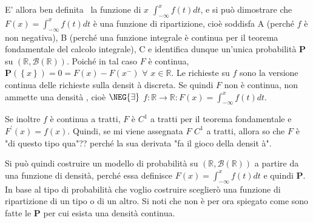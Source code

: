 \documentclass{article}
\begin{document}
E' allora ben definita \ la funzione di $x$ $\int_{-\infty }^{x}f\left(
t\right) dt$, e si pu\`{o} dimostrare che $F\left( x\right) =\int_{-\infty
}^{x}f\left( t\right) dt$ \`{e} una funzione di ripartizione, cio\`{e}
soddisfa A (perch\'{e} $f$ \`{e} non negativa), B (perch\'{e} una funzione
integrale \`{e} continua per il teorema fondamentale del calcolo integrale),
C e identifica dunque un'unica probabilit\`{a} $\mathbf{P}$ su $\left( 
\mathbb{R}
,\mathcal{B}\left( 
\mathbb{R}
\right) \right) $. Poich\'{e} in tal caso $F$ \`{e} continua, $\mathbf{P}%
\left( \left\{ x\right\} \right) =0=F\left( x\right) -F\left( x^{-}\right) $ 
$\forall $ $x\in 
\mathbb{R}
$. Le richieste su $f$ sono la versione continua delle richieste sulla densit%
\`{a} discreta. Se quindi $F$ non \`{e} continua, non ammette una densit\`{a}%
, cio\`{e} $\NEG{\exists}$ $f:%
\mathbb{R}
\rightarrow 
\mathbb{R}
:F\left( x\right) =\int_{-\infty }^{x}f\left( t\right) dt$.

Se inoltre $f$ \`{e} continua a tratti, $F$ \`{e} $C^{1}$ a tratti per il
teorema fondamentale e $F^{\prime }\left( x\right) =f\left( x\right) $.
Quindi, se mi viene assegnata $F$ $C^{1}$ a tratti, allora so che $F$ \`{e}
"di questo tipo qua"?? perch\'{e} la sua derivata "fa il gioco della densit%
\`{a}".

Si pu\`{o} quindi costruire un modello di probabilit\`{a} su $\left( 
\mathbb{R}
,\mathcal{B}\left( 
\mathbb{R}
\right) \right) $ a partire da una funzione di densit\`{a}, perch\'{e} essa
definisce $F\left( x\right) =\int_{-\infty }^{x}f\left( t\right) dt$ e
quindi $\mathbf{P}$. In base al tipo di probabilit\`{a} che voglio costruire
sceglier\`{o} una funzione di ripartizione di un tipo o di un altro. Si noti
che non \`{e} per ora spiegato come sono fatte le $\mathbf{P}$ per cui
esista una densit\`{a} continua.
\end{document}
